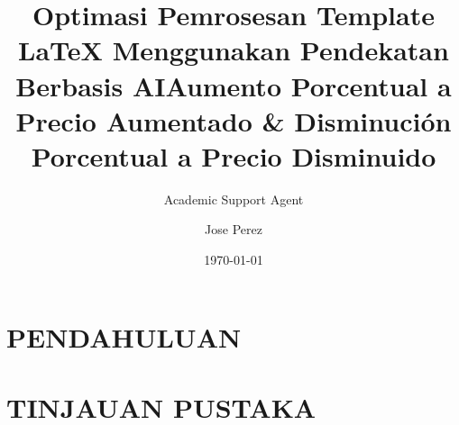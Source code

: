 \documentclass{article}
\title{Optimasi Pemrosesan Template LaTeX Menggunakan Pendekatan Berbasis AI}
\author{Academic Support Agent}
\date{\today}
\begin{document}
\maketitle

\begin{abstract}

\end{abstract}

\chapter{PENDAHULUAN}


\chapter{TINJAUAN PUSTAKA}


\usepackage{amsmath,amsfonts,amssymb}   %


\title{Aumento Porcentual a Precio Aumentado \& Disminuci\'on Porcentual a Precio Disminuido}
\author{Jose Perez}

\end{document}
